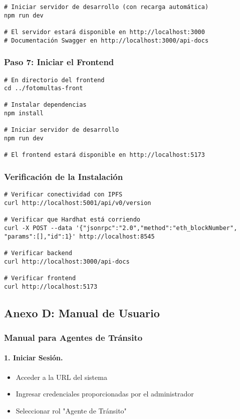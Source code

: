 \begin{verbatim}
# Iniciar servidor de desarrollo (con recarga automática)
npm run dev

# El servidor estará disponible en http://localhost:3000
# Documentación Swagger en http://localhost:3000/api-docs
\end{verbatim}

\subsubsection{Paso 7: Iniciar el Frontend}

\begin{verbatim}
# En directorio del frontend
cd ../fotomultas-front

# Instalar dependencias
npm install

# Iniciar servidor de desarrollo
npm run dev

# El frontend estará disponible en http://localhost:5173
\end{verbatim}

\subsubsection{Verificación de la Instalación}

\begin{verbatim}
# Verificar conectividad con IPFS
curl http://localhost:5001/api/v0/version

# Verificar que Hardhat está corriendo
curl -X POST --data '{"jsonrpc":"2.0","method":"eth_blockNumber",
"params":[],"id":1}' http://localhost:8545

# Verificar backend
curl http://localhost:3000/api-docs

# Verificar frontend
curl http://localhost:5173
\end{verbatim}

\subsection{Anexo D: Manual de Usuario}

\subsubsection{Manual para Agentes de Tránsito}

\paragraph{1. Iniciar Sesión.}
\begin{itemize}
    \item Acceder a la URL del sistema
    \item Ingresar credenciales proporcionadas por el administrador
    \item Seleccionar rol "Agente de Tránsito"
\end{itemize}

